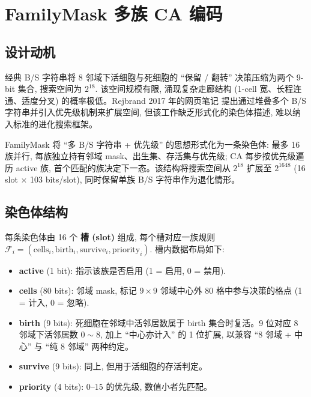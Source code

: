 
\section{FamilyMask 多族 CA 编码}
\label{sec:familymask}

\subsection{设计动机}

经典 B/S 字符串将 8 邻域下活细胞与死细胞的 ``保留 / 翻转'' 决策压缩为两个 9-bit 集合, 搜索空间为 $2^{18}$. 该空间规模有限, 涌现复杂走廊结构 (1-cell 宽、长程连通、适度分叉) 的概率极低。Rejbrand 2017 年的网页笔记 \cite{rejbrand2017} 提出通过堆叠多个 B/S 字符串并引入优先级机制来扩展空间, 但该工作缺乏形式化的染色体描述, 难以纳入标准的进化搜索框架。

FamilyMask 将 ``多 B/S 字符串 + 优先级'' 的思想形式化为一条染色体: 最多 16 族并行, 每族独立持有邻域 mask、出生集、存活集与优先级; CA 每步按优先级遍历 active 族, 首个匹配的族决定下一态。该结构将搜索空间从 $2^{18}$ 扩展至 $2^{1648}$ (16 slot $\times$ 103 bits/slot), 同时保留单族 B/S 字符串作为退化情形。

\subsection{染色体结构}

每条染色体由 16 个 \textbf{槽 (slot)} 组成, 每个槽对应一族规则 $\mathcal{F}_i = (\text{cells}_i, \text{birth}_i, \text{survive}_i, \text{priority}_i)$. 槽内数据布局如下:
\begin{itemize}[leftmargin=*, itemsep=0pt, topsep=0pt]
  \item \textbf{active} (1 bit): 指示该族是否启用 (1 = 启用, 0 = 禁用).
  \item \textbf{cells} (80 bits): 邻域 mask, 标记 $9 \times 9$ 邻域中心外 80 格中参与决策的格点 (1 = 计入, 0 = 忽略).
  \item \textbf{birth} (9 bits): 死细胞在邻域中活邻居数属于 birth 集合时复活。9 位对应 8 邻域下活邻居数 $0 \sim 8$, 加上 ``中心亦计入'' 的 1 位扩展, 以兼容 ``8 邻域 + 中心'' 与 ``纯 8 邻域'' 两种约定。
  \item \textbf{survive} (9 bits): 同上, 但用于活细胞的存活判定。
  \item \textbf{priority} (4 bits): $0$--$15$ 的优先级, 数值小者先匹配。
\end{itemize}

